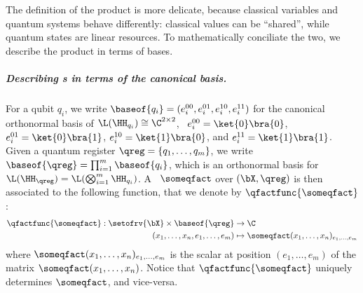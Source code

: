 The definition of the product is more delicate, because classical variables and quantum systems behave differently: classical values can be ``shared'', while quantum states are linear resources.
To mathematically conciliate the two, we describe the product in terms of bases.

\subparagraph{Describing \qfactor s in terms of the canonical basis.}

For a qubit $q_i$, we write $\baseof{q_i} = (e^{00}_i,e^{01}_i,e^{10}_i,e^{11}_i)$ for the canonical orthonormal basis of $\L(\HH_{q_i}) \cong \C^{2\times 2}$, \ie\ $e^{00}_i = \ket{0}\bra{0}$, $e^{01}_i = \ket{0}\bra{1}$, $e^{10}_i = \ket{1}\bra{0}$, and $e^{11}_i = \ket{1}\bra{1}$.
Given a quantum register $\qreg = \{q_1, \dots, q_m\}$, we write $\baseof{\qreg} = \prod_{i=1}^m\baseof{q_i}$, which is an orthonormal basis for $\L(\HH_\qreg) = \L(\bigotimes_{i=1}^m \HH_{q_i})$.
A \qfactor\ $\someqfact$ over $(\bX,\qreg)$ is then associated to the following function, that we denote by $\qfactfunc{\someqfact}$:
\begin{align*}
\qfactfunc{\someqfact}: \setofrv{\bX} \times \baseof{\qreg} &\to \C\\
(x_1,\dots,x_n,e_1,\dots,e_m)&\mapsto \someqfact(x_1,\dots,x_n)_{e_1,\dots,e_m}
\end{align*}
where $\someqfact(x_1,\dots,x_n)_{e_1,\dots,e_m}$ is the scalar at position $(e_1,\dots,e_m)$ of the matrix $\someqfact(x_1,\dots,x_n)$.
Notice that $\qfactfunc{\someqfact}$ uniquely determines $\someqfact$, and vice-versa.

